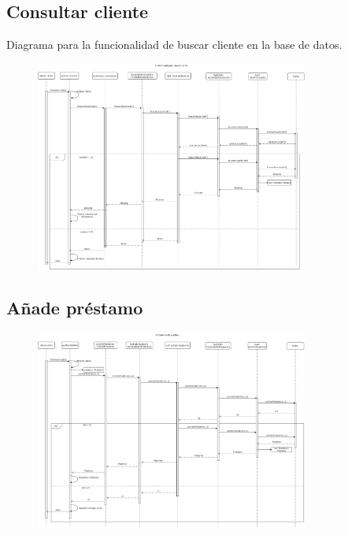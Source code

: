 \documentclass[12pt]{article}
\begin{document}
\subsection{Consultar cliente}
Diagrama para la funcionalidad de buscar cliente en la base de datos.
\begin{figure}[H]
    \centering
    \includegraphics[width=0.8\textwidth]{images/gestor_selecciona_cliente_consultar_5.png}
\end{figure}
\subsection{Añade préstamo}

\begin{figure}[H]
    \centering
    \includegraphics[width=0.8\textwidth]{images/ClienteSolicitaPrestamo2.png}
\end{figure}
\end{document}
